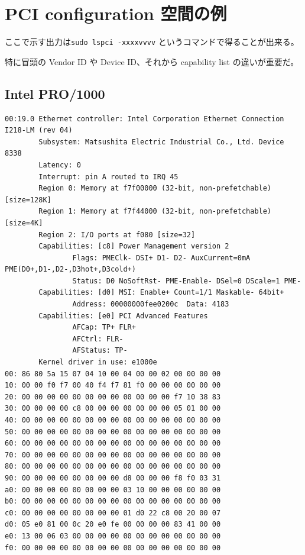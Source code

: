 \documentclass[a4paper,11pt,report]{ltjsbook}
\begin{document}
\appendix
\chapter{PCI configuration 空間の例}

ここで示す出力は\texttt{sudo lspci -xxxxvvvv} というコマンドで得ることが出来る。

特に冒頭の Vendor ID や Device ID、それから capability list の違いが重要だ。

\section{Intel PRO/1000}

\small
\begin{verbatim}
00:19.0 Ethernet controller: Intel Corporation Ethernet Connection I218-LM (rev 04)
        Subsystem: Matsushita Electric Industrial Co., Ltd. Device 8338
        Latency: 0
        Interrupt: pin A routed to IRQ 45
        Region 0: Memory at f7f00000 (32-bit, non-prefetchable) [size=128K]
        Region 1: Memory at f7f44000 (32-bit, non-prefetchable) [size=4K]
        Region 2: I/O ports at f080 [size=32]
        Capabilities: [c8] Power Management version 2
                Flags: PMEClk- DSI+ D1- D2- AuxCurrent=0mA PME(D0+,D1-,D2-,D3hot+,D3cold+)
                Status: D0 NoSoftRst- PME-Enable- DSel=0 DScale=1 PME-
        Capabilities: [d0] MSI: Enable+ Count=1/1 Maskable- 64bit+
                Address: 00000000fee0200c  Data: 4183
        Capabilities: [e0] PCI Advanced Features
                AFCap: TP+ FLR+
                AFCtrl: FLR-
                AFStatus: TP-
        Kernel driver in use: e1000e
00: 86 80 5a 15 07 04 10 00 04 00 00 02 00 00 00 00
10: 00 00 f0 f7 00 40 f4 f7 81 f0 00 00 00 00 00 00
20: 00 00 00 00 00 00 00 00 00 00 00 00 f7 10 38 83
30: 00 00 00 00 c8 00 00 00 00 00 00 00 05 01 00 00
40: 00 00 00 00 00 00 00 00 00 00 00 00 00 00 00 00
50: 00 00 00 00 00 00 00 00 00 00 00 00 00 00 00 00
60: 00 00 00 00 00 00 00 00 00 00 00 00 00 00 00 00
70: 00 00 00 00 00 00 00 00 00 00 00 00 00 00 00 00
80: 00 00 00 00 00 00 00 00 00 00 00 00 00 00 00 00
90: 00 00 00 00 00 00 00 00 d8 00 00 00 f8 f0 03 31
a0: 00 00 00 00 00 00 00 00 03 10 00 00 00 00 00 00
b0: 00 00 00 00 00 00 00 00 00 00 00 00 00 00 00 00
c0: 00 00 00 00 00 00 00 00 01 d0 22 c8 00 20 00 07
d0: 05 e0 81 00 0c 20 e0 fe 00 00 00 00 83 41 00 00
e0: 13 00 06 03 00 00 00 00 00 00 00 00 00 00 00 00
f0: 00 00 00 00 00 00 00 00 00 00 00 00 00 00 00 00
\end{verbatim}
\end{document}

